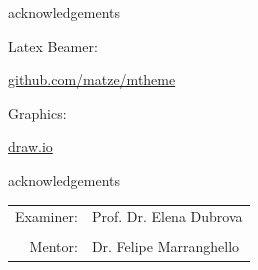 \documentclass[10pt, compress]{beamer}
\begin{document}
\begin{frame}{acknowledgements}

    Latex Beamer:

    \begin{center}\url{github.com/matze/mtheme}\end{center}

    Graphics:
    
    \begin{center}\url{draw.io}\end{center}
    
\end{frame}


\begin{frame}{acknowledgements}
    \begin{center}
        \begin{tabular}{r l}
            Examiner: & Prof. Dr. Elena Dubrova\\
            & \\
            Mentor: & Dr. Felipe Marranghello
        \end{tabular}
    \end{center}
\end{frame}

\end{document}
